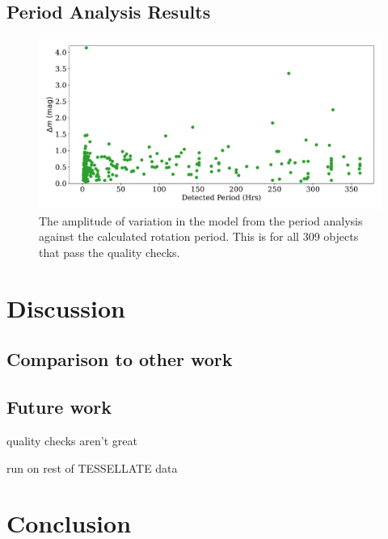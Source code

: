 \documentclass{UCreport}
\begin{document}
\subsection{Period Analysis Results}\label{SubSec:PerRes}


\begin{figure}
  \centering
  \includegraphics[width = \textwidth]{../OzData/QualPervsAmp1.pdf}
  \caption[Amplitude of Variation against Rotaion Period]{The amplitude of variation in the model from the period analysis against the calculated rotation period.
  This is for all 309 %
  objects that pass the quality checks.
  }
  \label{Fig:perVSamp}
\end{figure}


\section{Discussion}\label{Sec:Disc}

\subsection{Comparison to other work }%



\subsection{Future work}

quality checks aren't great

run on rest of TESSELLATE data

\section{Conclusion}\label{Sec:Conc}
\end{document}
